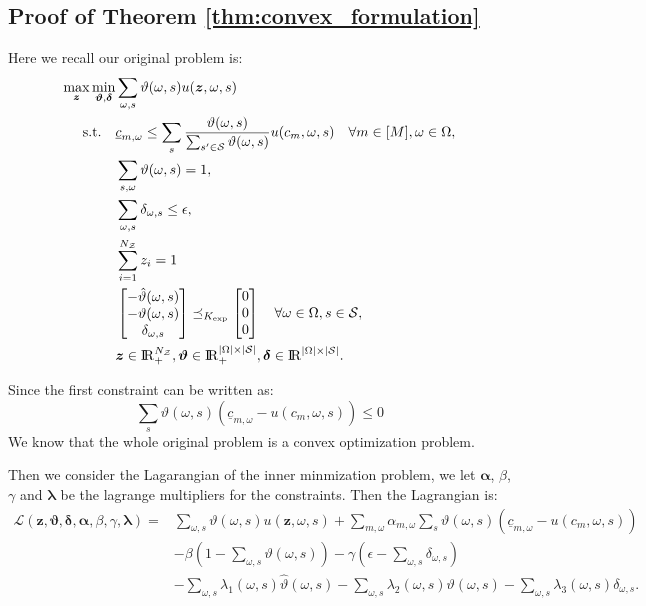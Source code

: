 \documentclass[11pt,oneside]{article}
\theoremstyle{plain}
\theoremstyle{plain}
\theoremstyle{plain}
\theoremstyle{plain}
\theoremstyle{plain}
\theoremstyle{definition}
\theoremstyle{definition}
\theoremstyle{remark}
\theoremstyle{plain}
\newcommand{\R}{{\rm I\!R}}
\renewcommand{\Re}{\R}
\renewcommand{\Re}{\R}
\newcommand{\mcs}{{\cal S}}
\begin{document}
\subsection{Proof of Theorem \ref{thm:convex_formulation}}
Here we recall our original problem is:
\begin{align*}
    \max_{\boldsymbol{z}} \min_{\boldsymbol{\vartheta},\boldsymbol{\delta}} & \sum_{\omega,s}\vartheta(\omega,s) u(\boldsymbol{z},\omega,s) \\
    \text{s.t.}  \quad & \underline{c}_{m,\omega} \leq \sum_{s} \frac{\vartheta(\omega,s)}{\sum_{s'\in \mcs}\vartheta(\omega,s)} u(c_m,\omega,s) \quad \forall m \in [M], \omega \in \Omega, \\
    & \sum_{s,\omega} \vartheta(\omega,s) = 1, \\
    & \sum_{\omega,s} \delta_{\omega,s} \leq \epsilon, \\
    & \sum_{i=1} ^{N_\mathcal{Z}} z_i =1 \\
    & \begin{bmatrix}
        -\hat{\vartheta}(\omega,s) \\
        -\vartheta(\omega,s) \\
        \delta_{\omega,s}
    \end{bmatrix} \preceq_{K_{\text{exp}}} \begin{bmatrix}
        0 \\
        0 \\
        0
    \end{bmatrix} \quad \forall \omega \in \Omega, s\in \mcs,\\
    & \boldsymbol{z} \in \R^{N_\mathcal{Z}}_+, \boldsymbol{\vartheta} \in \R_+^{|\Omega|\times |\mcs|}, \boldsymbol{\delta}\in \Re^{|\Omega|\times |\mcs|}.
\end{align*}

Since the first constraint can be written as: $$\sum_s\vartheta(\omega,s) (\underline{c}_{m,\omega} - u(c_m,\omega,s)) \leq 0$$
We know that the whole original problem is a convex optimization problem. 

Then we consider the Lagarangian of the inner minmization problem, we let $\boldsymbol{\alpha}$, $\beta$, $\gamma$ and $\boldsymbol{\lambda}$ be the lagrange multipliers for the constraints. Then the Lagrangian is:
\begin{align*}
    \mathcal{L}(\boldsymbol{z},\boldsymbol{\vartheta},\boldsymbol{\delta},\boldsymbol{\alpha},\beta,\gamma,\boldsymbol{\lambda}) = & \sum_{\omega,s}\vartheta(\omega,s) u(\boldsymbol{z},\omega,s) + \sum_{m,\omega} \alpha_{m,\omega} \sum_s \vartheta(\omega,s) \left( \underline{c}_{m,\omega} - u(c_m,\omega,s)\right)\\
    & - \beta \left(1 - \sum_{\omega,s} \vartheta(\omega,s)\right) - \gamma \left( \epsilon - \sum_{\omega,s} \delta_{\omega,s}\right)\\
    & - \sum_{\omega,s} \lambda_{1}(\omega,s) \hat{\vartheta}(\omega,s) - \sum_{\omega,s} \lambda_{2}(\omega,s) \vartheta(\omega,s) - \sum_{\omega,s} \lambda_{3}(\omega,s) \delta_{\omega,s}.
\end{align*}
\end{document}
